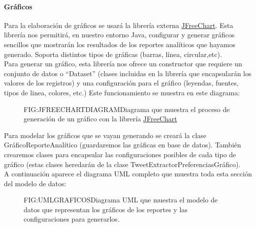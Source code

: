 \paragraph{Gráficos}
Para la elaboración de gráficos se usará la librería externa  \href{http://www.jfree.org/jfreechart/}{JFreeChart}. Esta librería nos permitirá, en nuestro entorno Java, configurar y generar gráficos sencillos que mostrarán los resultados de los reportes analíticos que hayamos generado. Soporta distintos tipos de gráficas (barras, línea, circular,etc).\\
Para generar un gráfico, esta librería nos ofrece un constructor que requiere un conjunto de datos o ``Dataset'' (clases incluidas en la librería que encapsularán los valores de los registros) y una configuración para el gráfico (leyendas, fuentes, tipos de linea, colores, etc.) Este funcionamiento se muestra en este diagrama:

\begin{figure}[Funcionamiento general de JFreeChart]{FIG:JFREECHARTDIAGRAM}{Diagrama que muestra el proceso de generación de un gráfico con la librería \href{http://www.jfree.org/jfreechart/}{JFreeChart}}
\end{figure}

Para modelar los gráficos que se vayan generando se creará la clase GráficoReporteAnalítico (guardaremos las gráficas en base de datos). También crearemos clases para encapsular las configuraciones posibles de cada tipo de gráfico (estas clases heredarán de la clase TweetExtractorPreferenciasGráfico). \\
A continuación aparece el diagrama UML completo que muestra toda esta sección del modelo de datos:

\begin{figure}[Diagrama UML Preferencias Gráficos]{FIG:UMLGRAFICOS}{Diagrama UML que muestra el modelo de datos que representan los gráficos de los reportes y las configuraciones para generarlos.}
\end{figure}

